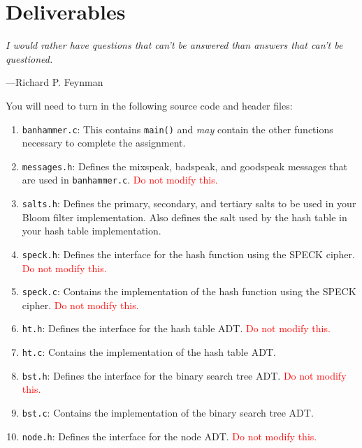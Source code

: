\section{Deliverables}

\epigraph{\emph{I would rather have questions that can't be answered than
answers that can't be questioned.}}{---Richard P. Feynman}

\noindent You will need to turn in the following source code and header files:

\begin{enumerate}
  \item \texttt{banhammer.c}: This contains \texttt{main()} and
    \emph{may} contain the other functions necessary to complete the
    assignment.

  \item \texttt{messages.h}: Defines the mixspeak, badspeak, and
    goodspeak messages that are used in \texttt{banhammer.c}.
    \textcolor{red}{Do not modify this.}

  \item \texttt{salts.h}: Defines the primary, secondary, and tertiary
    salts to be used in your Bloom filter implementation. Also defines
    the salt used by the hash table in your hash table implementation.

  \item \texttt{speck.h}: Defines the interface for the hash function
    using the SPECK cipher. \textcolor{red}{Do not modify this.}

  \item \texttt{speck.c}: Contains the implementation of the hash
    function using the SPECK cipher. \textcolor{red}{Do not modify this.}

  \item \texttt{ht.h}: Defines the interface for the hash table ADT.
    \textcolor{red}{Do not modify this.}

  \item \texttt{ht.c}: Contains the implementation of the hash table
    ADT.

  \item \texttt{bst.h}: Defines the interface for the binary search tree
    ADT. \textcolor{red}{Do not modify this.}

  \item \texttt{bst.c}: Contains the implementation of the binary search
    tree ADT.

  \item \texttt{node.h}: Defines the interface for the node ADT.
    \textcolor{red}{Do not modify this.}


\end{enumerate}
